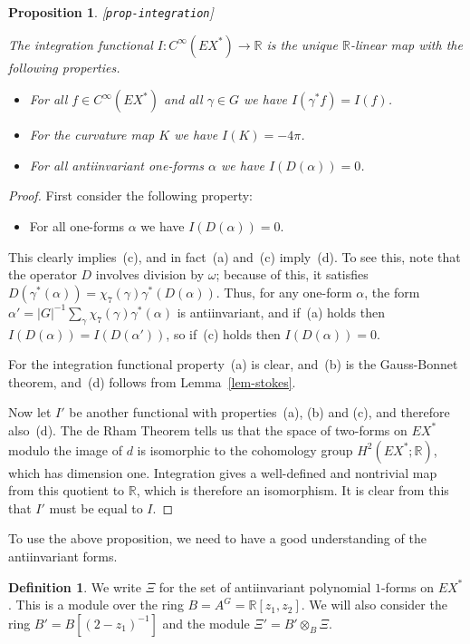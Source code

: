 \documentclass[reqno]{amsart}
\newcommand{\lbl}[1]{\label{#1}\textup{[\texttt{#1}]}\par}
\newcommand{\lbl}{\label}
\newcommand{\al}        {\alpha}
\newcommand{\gm}        {\gamma}
\newcommand{\om}        {\omega}
\newcommand{\R}         {{\mathbb{R}}}
\newcommand{\ot}        {\otimes}
\renewcommand{\:}{\colon}
\newtheorem{proposition}[theorem]{Proposition}
\theoremstyle{definition}
\newtheorem{definition}[theorem]{Definition}
\begin{document}
\begin{proposition}\lbl{prop-integration}
 The integration functional $I\:C^\infty(EX^*)\to\R$ is the unique
 $\R$-linear map with the following properties.
 \begin{itemize}
  \item[(a)] For all $f\in C^\infty(EX^*)$ and all $\gm\in G$ we
   have $I(\gm^*f)=I(f)$.
  \item[(b)] For the curvature map $K$ we have $I(K)=-4\pi$.
  \item[(c)] For all antiinvariant one-forms $\al$ we have
   $I(D(\al))=0$.
 \end{itemize}
\end{proposition}
\begin{proof}
 First consider the following property:
 \begin{itemize}
  \item[(d)] For all one-forms $\al$ we have $I(D(\al))=0$.
 \end{itemize}
 This clearly implies~(c), and in fact~(a) and~(c) imply~(d).  To see
 this, note that the operator $D$ involves division by $\om$; because
 of this, it satisfies $D(\gm^*(\al))=\chi_7(\gm)\gm^*(D(\al))$.
 Thus, for any one-form $\al$, the form
 $\al'=|G|^{-1}\sum_\gm\chi_7(\gm)\gm^*(\al)$ is antiinvariant, and
 if~(a) holds then $I(D(\al))=I(D(\al'))$, so if~(c) holds then
 $I(D(\al))=0$.

 For the integration functional property~(a) is clear, and~(b) is the
 Gauss-Bonnet theorem, and~(d) follows from Lemma~\ref{lem-stokes}.

 Now let $I'$ be another functional with properties~(a), (b) and (c),
 and therefore also~(d).  The de Rham Theorem tells us that the space
 of two-forms on $EX^*$ modulo the image of $d$ is isomorphic to the
 cohomology group $H^2(EX^*;\R)$, which has dimension one.  Integration
 gives a well-defined and nontrivial map from this quotient to $\R$,
 which is therefore an isomorphism.  It is clear from this that $I'$
 must be equal to $I$.
\end{proof}

To use the above proposition, we need to have a good understanding of
the antiinvariant forms.
\begin{definition}
 We write $\Xi$ for the set of antiinvariant polynomial $1$-forms on
 $EX^*$.  This is a module over the ring $B=A^G=\R[z_1,z_2]$.  We will
 also consider the ring $B'=B[(2-z_1)^{-1}]$ and the module
 $\Xi'=B'\ot_B\Xi$.
\end{definition}
\end{document}
